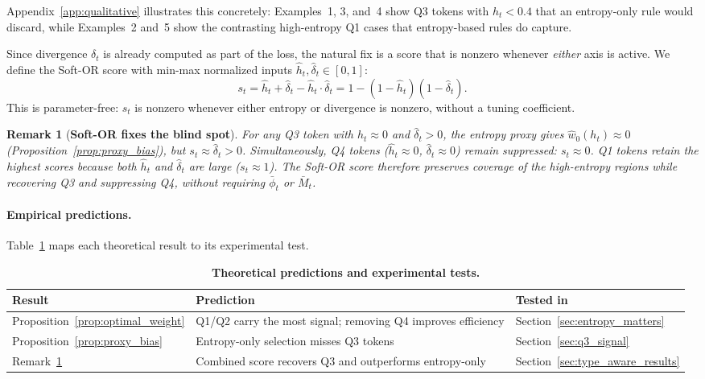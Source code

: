\documentclass{article}
\newtheorem{remark}{Remark}
\begin{document}
\noindent Appendix~\ref{app:qualitative} illustrates this concretely: Examples~1, 3, and~4 show Q3 tokens with $h_t < 0.4$ that an entropy-only rule would discard, while Examples~2 and~5 show the contrasting high-entropy Q1 cases that entropy-based rules do capture.

Since divergence $\delta_t$ is already computed as part of the loss, the natural fix is a score that is nonzero whenever \emph{either} axis is active.
We define the Soft-OR score with min-max normalized inputs $\hat{h}_t, \hat{\delta}_t \in [0,1]$:
\begin{equation}
    s_t = \hat{h}_t + \hat{\delta}_t - \hat{h}_t \cdot \hat{\delta}_t
        = 1 - (1-\hat{h}_t)(1-\hat{\delta}_t).
    \label{eq:score_theory}
\end{equation}
This is parameter-free: $s_t$ is nonzero whenever either entropy or divergence is nonzero, without a tuning coefficient.

\begin{remark}[\textbf{Soft-OR fixes the blind spot}]
\label{rem:fix}
For any Q3 token with $\hat{h}_t \approx 0$ and $\hat{\delta}_t > 0$, the entropy proxy gives $\hat{w}_0(h_t) \approx 0$ (Proposition~\ref{prop:proxy_bias}), but $s_t \approx \hat{\delta}_t > 0$.
Simultaneously, Q4 tokens ($\hat{h}_t \approx 0$, $\hat{\delta}_t \approx 0$) remain suppressed: $s_t \approx 0$.
Q1 tokens retain the highest scores because both $\hat{h}_t$ and $\hat{\delta}_t$ are large ($s_t \approx 1$).
The Soft-OR score therefore preserves coverage of the high-entropy regions while recovering Q3 and suppressing Q4, without requiring $\bar\phi_t$ or $\bar M_t$.
\end{remark}

\paragraph{Empirical predictions.}
Table~\ref{tab:theory_predictions} maps each theoretical result to its experimental test.

\begin{table}[h]
\centering
\caption{\textbf{Theoretical predictions and experimental tests.}}
\label{tab:theory_predictions}
\small
\begin{tabular}{l l l}
\toprule
Result & Prediction & Tested in \\
\midrule
Proposition~\ref{prop:optimal_weight} & Q1/Q2 carry the most signal; removing Q4 improves efficiency & Section~\ref{sec:entropy_matters} \\
Proposition~\ref{prop:proxy_bias} & Entropy-only selection misses Q3 tokens & Section~\ref{sec:q3_signal} \\
Remark~\ref{rem:fix} & Combined score recovers Q3 and outperforms entropy-only & Section~\ref{sec:type_aware_results} \\
\bottomrule
\end{tabular}
\end{table}
\end{document}
